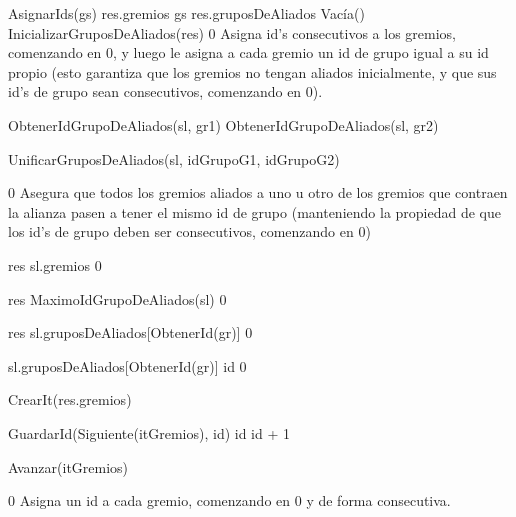 {
	\state AsignarIds(gs)
	\state res.gremios \asig gs 						
	\state
	\state res.gruposDeAliados \asig Vacía()			
	\state InicializarGruposDeAliados(res)
}
{0}
{Asigna id's consecutivos a los gremios, comenzando en 0, y luego le asigna a cada gremio un id de grupo igual a su id propio (esto garantiza que los gremios no tengan aliados inicialmente, y que sus id's de grupo sean consecutivos, comenzando en 0). }

{
	\state {} \asig ObtenerIdGrupoDeAliados(sl, gr1)			
	\state {} \asig ObtenerIdGrupoDeAliados(sl, gr2)			
	\state 

													
		\state UnificarGruposDeAliados(sl, idGrupoG1, idGrupoG2)					
	\endif
}
{0}
{ Asegura que todos los gremios aliados a uno u otro de los gremios que contraen la alianza pasen a tener el mismo id de grupo (manteniendo la propiedad de que los id's de grupo deben ser consecutivos, comenzando en 0) }

{
	\state res \asig sl.gremios								
}
{0}
{}

{
	\state res \asig MaximoIdGrupoDeAliados(sl)			
}
{0}
{}

{
	\state res \asig sl.gruposDeAliados[ObtenerId(gr)]			
}
{0}
{}

{
	\state sl.gruposDeAliados[ObtenerId(gr)] \asig id			
}
{0}
{}

{
	\state {} 											
	\state

	\state {} \asig CrearIt(res.gremios)		
		\state
		
		\state GuardarId(Siguiente(itGremios), id)							
		\state id \asig id + 1												
		
		\state
		\state Avanzar(itGremios)											
	\endwhile
}
{0}
{ Asigna un id a cada gremio, comenzando en 0 y de forma consecutiva. }

